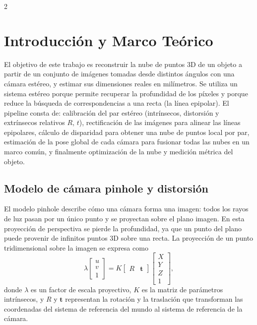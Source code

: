 \documentclass[10pt,a4paper]{article}
\begin{document}
\begin{multicols}{2}
\raggedcolumns

\section{Introducción y Marco Teórico}
El objetivo de este trabajo es reconstruir la nube de puntos 3D de un objeto a partir
de un conjunto de imágenes tomadas desde distintos ángulos con una cámara estéreo, y
estimar sus dimensiones reales en milímetros. Se utiliza un sistema estéreo porque
permite recuperar la profundidad de los píxeles y porque reduce la búsqueda de
correspondencias a una recta (la línea epipolar). El pipeline consta de: calibración
del par estéreo (intrínsecos, distorsión y extrínsecos relativos $R$, $t$), rectificación
de las imágenes para alinear las líneas epipolares, cálculo de disparidad para obtener
una nube de puntos local por par, estimación de la pose global de cada cámara para
fusionar todas las nubes en un marco común, y finalmente optimización de la nube y
medición métrica del objeto.

\subsection{Modelo de cámara pinhole y distorsión}
El modelo pinhole describe cómo una cámara forma una imagen: todos los rayos de luz pasan por un
único punto y se proyectan sobre el plano imagen. En esta proyección de perspectiva se pierde la
profundidad, ya que un punto del plano puede provenir de infinitos puntos 3D sobre una recta.
La proyección de un punto tridimensional sobre la imagen se expresa como
\begin{equation}\label{eq:proyeccion}
\lambda
\begin{bmatrix}
u\\v\\1
\end{bmatrix}
=
K
\begin{bmatrix}
R & \mathbf{t}
\end{bmatrix}
\begin{bmatrix}
X\\Y\\Z\\1
\end{bmatrix},
\end{equation}
donde $\lambda$ es un factor de escala proyectivo, $K$ es la matriz de
parámetros intrínsecos, y $R$ y $\mathbf{t}$ representan la rotación y
la traslación que transforman las coordenadas del sistema de referencia
del mundo al sistema de referencia de la cámara.


\end{multicols}
\end{document}
